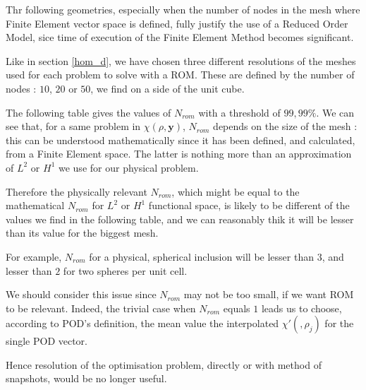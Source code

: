 
Thr following geometries, especially when the number of nodes in the mesh where Finite Element vector space is defined, fully justify the use of a Reduced Order Model, %
sice time of execution of the Finite Element Method becomes significant.

\par
Like in section \ref{hom_d}, we have chosen three different resolutions of the meshes used for each problem to solve with a ROM. %
These are defined by the number of nodes : $10$, $20$ or $50$, we find on a side of the unit cube.

\par
The following table gives the values of $N_{rom}$ with a threshold of $99,99\%$. We can see that, for a same problem in $\chi (\rho ,\mathbf{y})$, %
$N_{rom}$ depends on the size of the mesh : %
this can be understood mathematically since it has been defined, and calculated, from a Finite Element space. %
The latter is nothing more than an approximation of $L^2$ or $H^1$ we use for our physical problem.

\par
Therefore the physically relevant $N_{rom}$, which might be equal to the mathematical $N_{rom}$ for $L^2$ or $H^1$ functional space, %
is likely to be different of the values we find in the following table, %
and we can reasonably thik it will be lesser than its value for the biggest mesh.

\par
For example, $N_{rom}$ for a physical, spherical inclusion will be lesser than $3$, and lesser than $2$ for two spheres per unit cell.

\par
We should consider this issue since $N_{rom}$ may not be too small, if we want ROM to be relevant. %
Indeed, the trivial case when $N_{rom}$ equals $1$ leads us to choose, according to POD's definition, %
the mean value the interpolated $\chi '(,\rho_j)$ for the single POD vector.

\par
Hence resolution of the optimisation problem, directly or with method of snapshots, would be no longer useful.

